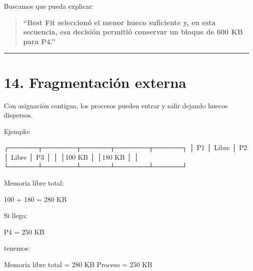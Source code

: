 \documentclass[
  spanish,
  letterpaper,
]{scrbook}
\newenvironment{Shaded}{\begin{snugshade}}{\end{snugshade}}
\newcommand{\NormalTok}[1]{\textcolor[rgb]{0.00,0.23,0.31}{#1}}
\begin{document}
Buscamos que pueda explicar:

\begin{quote}
\textbf{``Best Fit seleccionó el menor hueco suficiente y, en esta
secuencia, esa decisión permitió conservar un bloque de 600 KB para
P4.''}
\end{quote}

\begin{center}\rule{0.5\linewidth}{0.5pt}\end{center}


\chapter{14. Fragmentación externa}\label{fragmentaciuxf3n-externa-1}

Con asignación contigua, los procesos pueden entrar y salir dejando
huecos dispersos.

Ejemplo:

\begin{Shaded}
\begin{Highlighting}[]
\NormalTok{┌──────┬───────┬──────┬───────┬──────┐}
\NormalTok{│ P1   │ Libre │ P2   │ Libre │ P3   │}
\NormalTok{│      │100 KB │      │180 KB │      │}
\NormalTok{└──────┴───────┴──────┴───────┴──────┘}
\end{Highlighting}
\end{Shaded}

Memoria libre total:

\begin{Shaded}
\begin{Highlighting}[]
\NormalTok{100 + 180 = 280 KB}
\end{Highlighting}
\end{Shaded}

Si llega:

\begin{Shaded}
\begin{Highlighting}[]
\NormalTok{P4 = 250 KB}
\end{Highlighting}
\end{Shaded}

tenemos:

\begin{Shaded}
\begin{Highlighting}[]
\NormalTok{Memoria libre total = 280 KB}
\NormalTok{Proceso              = 250 KB}
\end{Highlighting}
\end{Shaded}
\end{document}

